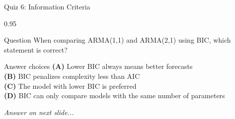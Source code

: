 \documentclass[9pt, aspectratio=169, t]{beamer}
\begin{document}
\begin{frame}{Quiz 6: Information Criteria}
    \begin{cminipage}{0.95\textwidth}
    \begin{alertblock}{Question}
        When comparing ARMA(1,1) and ARMA(2,1) using BIC, which statement is correct?
    \end{alertblock}

    \vspace{0.4cm}

    \begin{block}{Answer choices}
        \textcolor{MainBlue}{\textbf{(A)}} Lower BIC always means better forecasts\\[3pt]
        \textcolor{MainBlue}{\textbf{(B)}} BIC penalizes complexity less than AIC\\[3pt]
        \textcolor{MainBlue}{\textbf{(C)}} The model with lower BIC is preferred\\[3pt]
        \textcolor{MainBlue}{\textbf{(D)}} BIC can only compare models with the same number of parameters
    \end{block}

    \vspace{0.5cm}

    \begin{center}
        \textit{Answer on next slide...}
    \end{center}
    \end{cminipage}
\end{frame}
\end{document}

